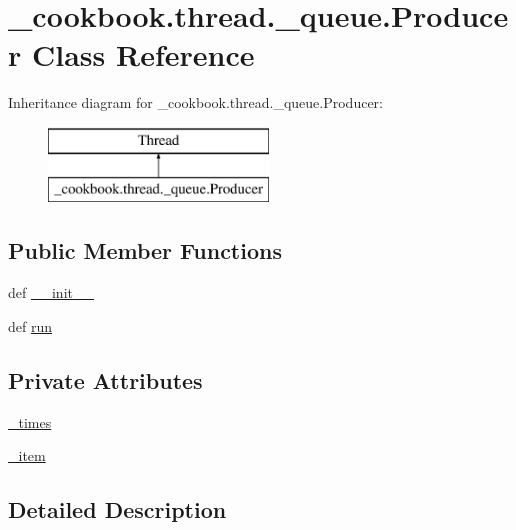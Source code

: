 \hypertarget{class__cookbook_1_1thread_1_1__queue_1_1Producer}{\section{\-\_\-cookbook.\-thread.\-\_\-queue.\-Producer Class Reference}
\label{class__cookbook_1_1thread_1_1__queue_1_1Producer}
}
Inheritance diagram for \-\_\-cookbook.\-thread.\-\_\-queue.\-Producer\-:\begin{figure}[H]
\begin{center}
\leavevmode
\includegraphics[height=2.000000cm]{d0/d3c/class__cookbook_1_1thread_1_1__queue_1_1Producer}
\end{center}
\end{figure}
\subsection*{Public Member Functions}
\begin{DoxyCompactItemize}
\item 
def \hyperlink{class__cookbook_1_1thread_1_1__queue_1_1Producer_a226dc5f01bf3c18175972c30a27a0aed}{\-\_\-\-\_\-init\-\_\-\-\_\-}
\item 
def \hyperlink{class__cookbook_1_1thread_1_1__queue_1_1Producer_a3ce42dbdcf7eae61b8ad89855369f7ce}{run}
\end{DoxyCompactItemize}
\subsection*{Private Attributes}
\begin{DoxyCompactItemize}
\item 
\hyperlink{class__cookbook_1_1thread_1_1__queue_1_1Producer_a685676fd503fe7d392b581506a7b3e8f}{\-\_\-times}
\item 
\hyperlink{class__cookbook_1_1thread_1_1__queue_1_1Producer_a5e71317515657aac1ad3839ab924c714}{\-\_\-item}
\end{DoxyCompactItemize}


\subsection{Detailed Description}


